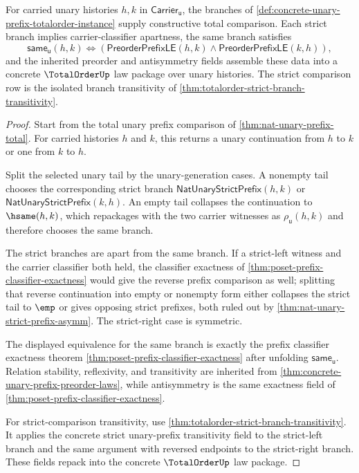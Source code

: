 \begin{theorem}
\label{thm:concrete-unary-prefix-totalorder-laws}
For carried unary histories $h,k$ in
$\mathsf{Carrier}_{\mathsf{u}}$, the branches of
\autoref{def:concrete-unary-prefix-totalorder-instance} supply constructive
total comparison. Each strict branch implies carrier-classifier apartness, the
same branch satisfies
$$
\mathsf{same}_{\mathsf{u}}(h,k)\Longleftrightarrow
(\mathsf{PreorderPrefixLE}(h,k)\land\mathsf{PreorderPrefixLE}(k,h)),
$$
and the inherited preorder and antisymmetry fields assemble these data into a
concrete $\TotalOrderUp$ law package over unary histories. The strict comparison
row is the isolated branch transitivity of
\autoref{thm:totalorder-strict-branch-transitivity}.
\end{theorem}
\begin{proof}
Start from the total unary prefix comparison of
\autoref{thm:nat-unary-prefix-total}. For carried histories $h$ and $k$, this
returns a unary continuation from $h$ to $k$ or one from $k$ to $h$.

Split the selected unary tail by the unary-generation cases. A nonempty tail
chooses the corresponding strict branch
$\mathsf{NatUnaryStrictPrefix}(h,k)$ or
$\mathsf{NatUnaryStrictPrefix}(k,h)$. An empty tail collapses the continuation
to $\hsame(h,k)$, which repackages with the two carrier witnesses as
$\rho_{\mathsf{u}}(h,k)$ and therefore chooses the same branch.

The strict branches are apart from the same branch. If a strict-left witness and
the carrier classifier both held, the classifier exactness of
\autoref{thm:poset-prefix-classifier-exactness} would give the reverse prefix
comparison as well; splitting that reverse continuation into empty or nonempty
form either collapses the strict tail to $\emp$ or gives opposing strict
prefixes, both ruled out by \autoref{thm:nat-unary-strict-prefix-asymm}. The
strict-right case is symmetric.

The displayed equivalence for the same branch is exactly the prefix classifier
exactness theorem \autoref{thm:poset-prefix-classifier-exactness} after
unfolding $\mathsf{same}_{\mathsf{u}}$. Relation stability, reflexivity, and
transitivity are inherited from
\autoref{thm:concrete-unary-prefix-preorder-laws}, while antisymmetry is the
same exactness field of \autoref{thm:poset-prefix-classifier-exactness}.

For strict-comparison transitivity, use
\autoref{thm:totalorder-strict-branch-transitivity}. It applies the concrete
strict unary-prefix transitivity field to the strict-left branch and the same
argument with reversed endpoints to the strict-right branch. These fields repack
into the concrete $\TotalOrderUp$ law package.
\end{proof}

